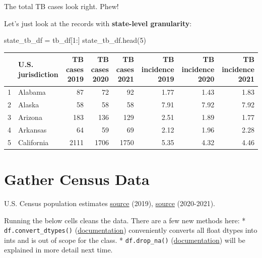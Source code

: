 \documentclass[
  letterpaper,
  DIV=11,
  numbers=noendperiod]{scrreprt}
\newenvironment{Shaded}{\begin{snugshade}}{\end{snugshade}}
\newcommand{\DecValTok}[1]{\textcolor[rgb]{0.68,0.00,0.00}{#1}}
\newcommand{\NormalTok}[1]{\textcolor[rgb]{0.00,0.23,0.31}{#1}}
\newcommand{\OperatorTok}[1]{\textcolor[rgb]{0.37,0.37,0.37}{#1}}
\begin{document}
The total TB cases look right. Phew!

Let's just look at the records with \textbf{state-level granularity}:

\begin{Shaded}
\begin{Highlighting}[]
\NormalTok{state\_tb\_df }\OperatorTok{=}\NormalTok{ tb\_df[}\DecValTok{1}\NormalTok{:]}
\NormalTok{state\_tb\_df.head(}\DecValTok{5}\NormalTok{)}
\end{Highlighting}
\end{Shaded}

\begin{tabular}{llrrrrrr}
\toprule
{} & U.S. jurisdiction &  TB cases 2019 &  TB cases 2020 &  TB cases 2021 &  TB incidence 2019 &  TB incidence 2020 &  TB incidence 2021 \\
\midrule
1 &           Alabama &             87 &             72 &             92 &               1.77 &               1.43 &               1.83 \\
2 &            Alaska &             58 &             58 &             58 &               7.91 &               7.92 &               7.92 \\
3 &           Arizona &            183 &            136 &            129 &               2.51 &               1.89 &               1.77 \\
4 &          Arkansas &             64 &             59 &             69 &               2.12 &               1.96 &               2.28 \\
5 &        California &           2111 &           1706 &           1750 &               5.35 &               4.32 &               4.46 \\
\bottomrule
\end{tabular}

\hypertarget{gather-census-data}{%
\section{Gather Census Data}\label{gather-census-data}}

U.S. Census population estimates
\href{https://www.census.gov/data/tables/time-series/demo/popest/2010s-state-total.html}{source}
(2019),
\href{https://www.census.gov/data/tables/time-series/demo/popest/2020s-state-total.html}{source}
(2020-2021).

Running the below cells cleans the data. There are a few new methods
here: * \texttt{df.convert\_dtypes()}
(\href{https://pandas.pydata.org/docs/reference/api/pandas.DataFrame.convert_dtypes.html}{documentation})
conveniently converts all float dtypes into ints and is out of scope for
the class. * \texttt{df.drop\_na()}
(\href{https://pandas.pydata.org/docs/reference/api/pandas.DataFrame.dropna.html}{documentation})
will be explained in more detail next time.
\end{document}
